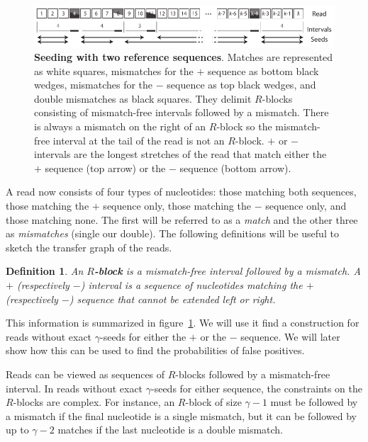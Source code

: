 \documentclass{article}
\newtheorem{definition}{Definition}
\begin{document}
\begin{figure}[h]
\centering
\includegraphics[scale=0.88]{sketch_dual_mutations.pdf}
\caption{\textbf{Seeding with two reference sequences}.
Matches are represented as white squares, mismatches for the
$+$ sequence as bottom black wedges, mismatches for the $-$ sequence as
top black wedges, and double mismatches as black squares. They delimit
$R$-blocks consisting of mismatch-free intervals followed by a mismatch.
There is always a mismatch on the right of an $R$-block so the
mismatch-free interval at the tail of the read is not an $R$-block. $+$ or
$-$ intervals are the longest stretches of the read that match either the
$+$ sequence (top arrow) or the $-$ sequence (bottom arrow).}
\label{fig:sketchdual}
\end{figure}

A read now consists of four types of nucleotides: those matching both
sequences, those matching the $+$ sequence only, those matching the $-$
sequence only, and those matching none. The first will be referred to as a
\emph{match} and the other three as \emph{mismatches} (single our double).
The following definitions will be useful to sketch the transfer graph of
the reads.

\begin{definition}
An \textbf{$R$-block} is a mismatch-free interval followed by a
mismatch. A $+$ (respectively $-$) interval is a sequence of nucleotides
matching the $+$ (respectively $-$) sequence that cannot be extended left
or right.
\end{definition}

This information is summarized in figure~\ref{fig:sketchdual}. We will use
it find a construction for reads without exact $\gamma$-seeds for either
the $+$ or the $-$ sequence. We will later show how this can be used to
find the probabilities of false positives.

Reads can be viewed as sequences of $R$-blocks followed by a mismatch-free
interval. In reads without exact $\gamma$-seeds for either sequence, the
constraints on the $R$-blocks are complex. For instance, an $R$-block of
size $\gamma-1$ must be followed by a mismatch if the final nucleotide
is a single mismatch, but it can be followed by up to $\gamma-2$ matches
if the last nucleotide is a double mismatch.
\end{document}
